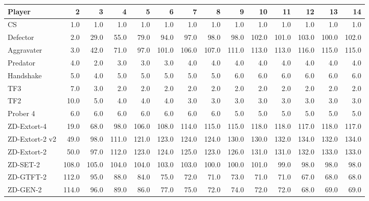 \begin{tabular}{lrrrrrrrrrrrrr}
\toprule
         Player &      2 &      3 &      4 &      5 &      6 &      7 &      8 &      9 &     10 &     11 &     12 &     13 &     14 \\
\midrule
             CS &    1.0 &    1.0 &    1.0 &    1.0 &    1.0 &    1.0 &    1.0 &    1.0 &    1.0 &    1.0 &    1.0 &    1.0 &    1.0 \\
       Defector &    2.0 &   29.0 &   55.0 &   79.0 &   94.0 &   97.0 &   98.0 &   98.0 &  102.0 &  101.0 &  103.0 &  100.0 &  102.0 \\
     Aggravater &    3.0 &   42.0 &   71.0 &   97.0 &  101.0 &  106.0 &  107.0 &  111.0 &  113.0 &  113.0 &  116.0 &  115.0 &  115.0 \\
       Predator &    4.0 &    2.0 &    3.0 &    3.0 &    3.0 &    4.0 &    4.0 &    4.0 &    4.0 &    4.0 &    4.0 &    4.0 &    4.0 \\
      Handshake &    5.0 &    4.0 &    5.0 &    5.0 &    5.0 &    5.0 &    5.0 &    6.0 &    6.0 &    6.0 &    6.0 &    6.0 &    6.0 \\
            TF3 &    7.0 &    3.0 &    2.0 &    2.0 &    2.0 &    2.0 &    2.0 &    2.0 &    2.0 &    2.0 &    2.0 &    2.0 &    2.0 \\
            TF2 &   10.0 &    5.0 &    4.0 &    4.0 &    4.0 &    3.0 &    3.0 &    3.0 &    3.0 &    3.0 &    3.0 &    3.0 &    3.0 \\
       Prober 4 &    6.0 &    6.0 &    6.0 &    6.0 &    6.0 &    6.0 &    6.0 &    5.0 &    5.0 &    5.0 &    5.0 &    5.0 &    5.0 \\
    ZD-Extort-4 &   19.0 &   68.0 &   98.0 &  106.0 &  108.0 &  114.0 &  115.0 &  115.0 &  118.0 &  118.0 &  117.0 &  118.0 &  117.0 \\
 ZD-Extort-2 v2 &   49.0 &   98.0 &  111.0 &  121.0 &  123.0 &  124.0 &  124.0 &  130.0 &  130.0 &  132.0 &  134.0 &  132.0 &  134.0 \\
    ZD-Extort-2 &   50.0 &   97.0 &  112.0 &  123.0 &  124.0 &  125.0 &  123.0 &  126.0 &  131.0 &  131.0 &  132.0 &  133.0 &  133.0 \\
       ZD-SET-2 &  108.0 &  105.0 &  104.0 &  104.0 &  103.0 &  103.0 &  100.0 &  100.0 &  101.0 &   99.0 &   98.0 &   98.0 &   98.0 \\
      ZD-GTFT-2 &  112.0 &   95.0 &   88.0 &   84.0 &   75.0 &   72.0 &   71.0 &   73.0 &   71.0 &   71.0 &   67.0 &   68.0 &   68.0 \\
       ZD-GEN-2 &  114.0 &   96.0 &   89.0 &   86.0 &   77.0 &   75.0 &   72.0 &   74.0 &   72.0 &   72.0 &   68.0 &   69.0 &   69.0 \\
\bottomrule
\end{tabular}
